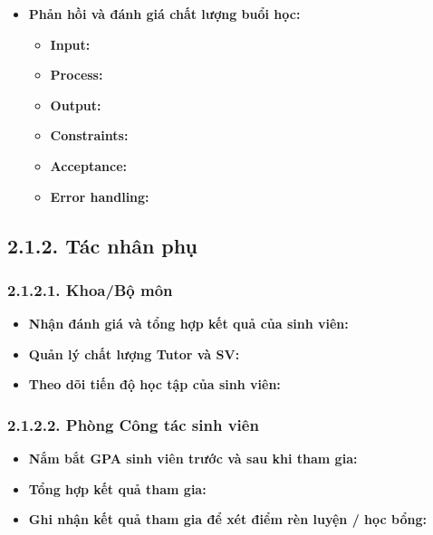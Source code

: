 \begin{itemize}
    \item \textbf{Phản hồi và đánh giá chất lượng buổi học:}
    \begin{itemize}
        \item \textbf{Input:}
        \item \textbf{Process:}
        \item \textbf{Output:}
        \item \textbf{Constraints:}
        \item \textbf{Acceptance:}
        \item \textbf{Error handling:}
    \end{itemize}
\end{itemize}


\subsection*{2.1.2. Tác nhân phụ}


\subsubsection*{2.1.2.1. Khoa/Bộ môn}
\begin{itemize}
    \item \textbf{Nhận đánh giá và tổng hợp kết quả của sinh viên:}
    \item \textbf{Quản lý chất lượng Tutor và SV:}
    \item \textbf{Theo dõi tiến độ học tập của sinh viên:}
\end{itemize}


\subsubsection*{2.1.2.2. Phòng Công tác sinh viên}
\begin{itemize}
    \item \textbf{Nắm bắt GPA sinh viên trước và sau khi tham gia:}
    \item \textbf{Tổng hợp kết quả tham gia:}
    \item \textbf{Ghi nhận kết quả tham gia để xét điểm rèn luyện / học bổng:}
\end{itemize}

